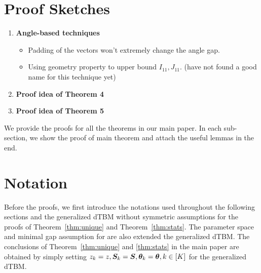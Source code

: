 \documentclass[lettersize,onecolumn,journal]{IEEEtran}
\theoremstyle{definition}
\theoremstyle{definition}
\begin{document}



{
\color{red}

\section{Proof Sketches}

\begin{enumerate}
\item \textbf{Angle-based techniques} 
\begin{itemize}
    \item Padding of the vectors won't extremely change the angle gap. 
    \item Using geometry property to upper bound $I_{11}, J_{11}$. (have not found a good name for this technique yet)
\end{itemize}
    \item \textbf{Proof idea of Theorem 4}
    \item \textbf{Proof idea of Theorem 5}
\end{enumerate}

}





\newpage
\appendix


We provide the proofs for all the theorems in our main paper. In each sub-section, we show the proof of main theorem and attach the useful lemmas in the end.

\section*{Notation}
Before the proofs, we first introduce the notations used throughout the following sections and the generalized dTBM without symmetric assumptions for the proofs of Theorem~\ref{thm:unique} and Theorem~\ref{thm:stats}. The parameter space and minimal gap assumption for are also extended the generalized dTBM. The conclusions of Theorem~\ref{thm:unique} and \ref{thm:stats} in the main paper are obtained by simply setting $z_k = z, \bm S_k = \bm S, \boldsymbol{\theta}_k = \boldsymbol{\theta}, k \in [K]$ for the generalized dTBM.
\end{document}
